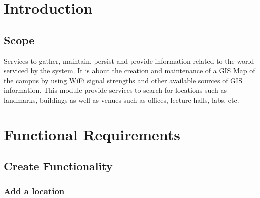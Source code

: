 \documentclass[runningheads,a4paper]{article}
\begin{document}
	\begingroup
	
	\tableofcontents
	\endgroup
	\newpage
	
	\section{Introduction}
	
	\subsection{Scope}
	Services to gather, maintain, persist and provide information related to the world
	serviced by the system. It is about the creation and maintenance of a GIS Map of the
	campus by using WiFi signal strengths and other available sources of GIS
	information.
	This module provide services to search for locations such as landmarks, buildings as
	well as venues such as offices, lecture halls, labs, etc.
	
	\section{Functional Requirements}
	\subsection{Create Functionality}
	\subsubsection{Add a location}
	
\end{document}
